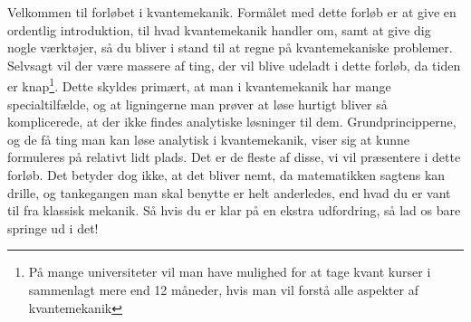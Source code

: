 \documentclass[../Kvantemekanik.tex]{subfiles}
\begin{document}
Velkommen til forløbet i kvantemekanik. Formålet med dette forløb er at give en ordentlig introduktion, til hvad kvantemekanik handler om, samt at give dig nogle værktøjer, så du bliver i stand til at regne på kvantemekaniske problemer. Selvsagt vil der være massere af ting, der vil blive udeladt i dette forløb, da tiden er knap\footnote{På mange universiteter vil man have mulighed for at tage kvant kurser i sammenlagt mere end 12 måneder, hvis man vil forstå alle aspekter af kvantemekanik}.
Dette skyldes primært, at man i kvantemekanik har mange specialtilfælde, og at ligningerne man prøver at løse hurtigt bliver så komplicerede, at der ikke findes analytiske løsninger til dem. Grundprincipperne, og de få ting man kan løse analytisk i kvantemekanik, viser sig at kunne formuleres på relativt lidt plads.
Det er de fleste af disse, vi vil præsentere i dette forløb.
Det betyder dog ikke, at det bliver nemt, da matematikken sagtens kan drille, og tankegangen man skal benytte er helt anderledes, end hvad du er vant til fra klassisk mekanik. Så hvis du er klar på en ekstra udfordring, så lad os bare springe ud i det!
\end{document}
